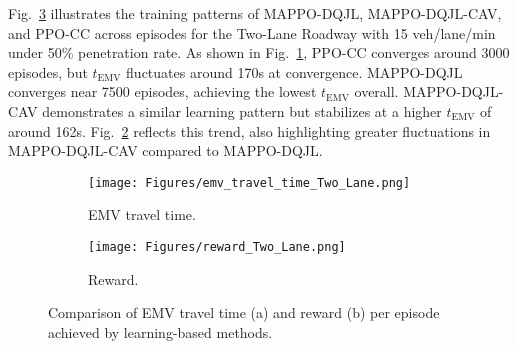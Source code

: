Fig.~\ref{fig:training} illustrates the training patterns of MAPPO-DQJL, MAPPO-DQJL-CAV, and PPO-CC across episodes for the Two-Lane Roadway with 15 veh/lane/min under 50\% penetration rate. As shown in Fig.~\ref{fig:emv_travel_time}, PPO-CC converges around 3000 episodes, but $t_{\text{EMV}}$ fluctuates around 170s at convergence. MAPPO-DQJL converges near 7500 episodes, achieving the lowest $t_{\text{EMV}}$ overall. MAPPO-DQJL-CAV demonstrates a similar learning pattern but stabilizes at a higher $t_{\text{EMV}}$ of around 162s. Fig.~\ref{fig:reward_per_episode} reflects this trend, also highlighting greater fluctuations in MAPPO-DQJL-CAV compared to MAPPO-DQJL.
\begin{figure}[hbtp]
    \centering
    \begin{subfigure}[b]{0.48\linewidth}
        \centering
        \texttt{[image: Figures/emv\_travel\_time\_Two\_Lane.png]}
        \caption{EMV travel time.}
        \label{fig:emv_travel_time}
    \end{subfigure}
    \hfill
    \begin{subfigure}[b]{0.48\linewidth}
        \centering
        \texttt{[image: Figures/reward\_Two\_Lane.png]}
        \caption{Reward.}
        \label{fig:reward_per_episode}
    \end{subfigure}
    \caption{Comparison of EMV travel time (a) and reward (b) per episode achieved by learning-based methods.}
    \label{fig:training}
\end{figure}

